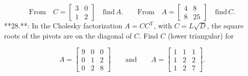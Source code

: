 \[\text{From}\quad C=\begin{bmatrix}3&0\\ 1&2\end{bmatrix}\quad\text{find}\,A.\qquad\text{From}\quad A=\begin{bmatrix} 4&8\\ 8&25\end{bmatrix}\quad\text{find}\,C.\]
**28.**: In the Cholesky factorization \(A=CC^{\mathrm{T}}\), with \(C=L\sqrt{D}\), the square roots of the pivots are on the diagonal of \(C\). Find \(C\) (lower triangular) for

\[A=\begin{bmatrix}9&0&0\\ 0&1&2\\ 0&2&8\end{bmatrix}\qquad\text{and}\qquad A=\begin{bmatrix}1&1&1\\ 1&2&2\\ 1&2&7\end{bmatrix}.\]